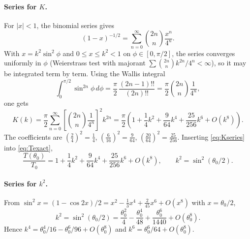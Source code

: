 \documentclass{article}
\begin{document}
\paragraph{Series for $K$.}
For $|x| < 1$, the binomial series gives
\begin{equation}
  (1-x)^{-1/2} = \sum_{n=0}^{\infty} \binom{2n}{n}\frac{x^n}{4^n}.
  \label{eq:binom}
\end{equation}
With $x = k^2\sin^2\phi$ and $0 \le x \le k^2 < 1$ on
$\phi \in [0,\pi/2]$, the series converges uniformly in $\phi$ (Weierstrass
test with majorant $\sum \binom{2n}{n} k^{2n}/4^n < \infty$), so it may be
integrated term by term. Using the Wallis integral
\begin{equation}
  \int_0^{\pi/2} \sin^{2n}\phi\, d\phi = \frac{\pi}{2}\,
  \frac{(2n-1)!!}{(2n)!!} = \frac{\pi}{2}\binom{2n}{n}\frac{1}{4^n},
  \label{eq:wallis}
\end{equation}
one gets
\begin{equation}
  K(k) = \frac{\pi}{2}\sum_{n=0}^{\infty}
    \left[\binom{2n}{n}\frac{1}{4^n}\right]^2 k^{2n}
  = \frac{\pi}{2}\left(1 + \frac{1}{4}k^2 + \frac{9}{64}k^4
    + \frac{25}{256}k^6 + O(k^8)\right).
  \label{eq:Kseries}
\end{equation}
The coefficients are $(\tfrac{2}{4})^2 = \tfrac14$,
$(\tfrac{6}{16})^2 = \tfrac{9}{64}$, $(\tfrac{20}{64})^2 = \tfrac{25}{256}$.
Inserting \eqref{eq:Kseries} into \eqref{eq:Texact},
\begin{equation}
  \frac{T(\theta_0)}{T_0} = 1 + \frac{1}{4}k^2 + \frac{9}{64}k^4
    + \frac{25}{256}k^6 + O(k^8),
  \qquad k^2 = \sin^2(\theta_0/2).
  \label{eq:Tk}
\end{equation}

\paragraph{Series for $k^2$.}
From $\sin^2 x = (1-\cos 2x)/2 = x^2 - \tfrac{1}{3}x^4 + \tfrac{2}{45}x^6
+ O(x^8)$ with $x = \theta_0/2$,
\begin{equation}
  k^2 = \sin^2(\theta_0/2) = \frac{\theta_0^2}{4} - \frac{\theta_0^4}{48}
    + \frac{\theta_0^6}{1440} + O(\theta_0^8).
  \label{eq:k2}
\end{equation}
Hence $k^4 = \theta_0^4/16 - \theta_0^6/96 + O(\theta_0^8)$ and
$k^6 = \theta_0^6/64 + O(\theta_0^8)$.
\end{document}

